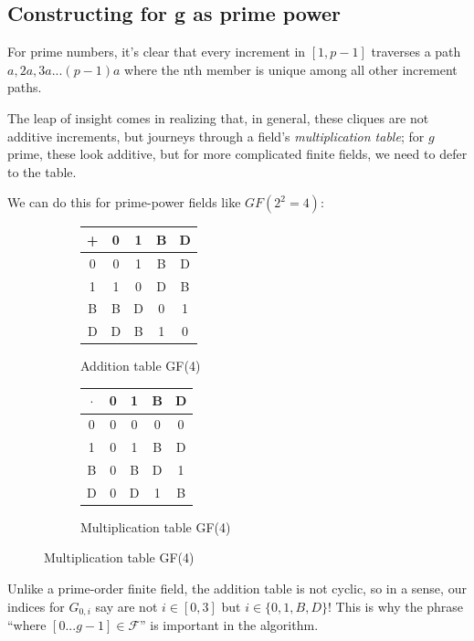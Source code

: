 \documentclass[11pt, oneside]{article} 	%
\begin{document}
\subsection{Constructing for g as prime power}

For prime numbers, it's clear that every increment in $[1, p-1]$ traverses a path $a, 2a, 3a ... (p-1)a$ where the nth member is unique among all other increment paths.

The leap of insight comes in realizing that, in general, these cliques are not additive increments, but journeys through a field's \emph{multiplication table}; for $g$ prime, these look additive, but for more complicated finite fields, we need to defer to the table.

We can do this for prime-power fields like $GF(2^2=4)$: 

\begin{figure}[!htb]
\centering
\begin{subfigure}{.3\textwidth}
 \centering
 \begin{tabular}{c | c c c c}
 + & 0 & 1 & B & D \\
\hline
 0 & 0 & 1 & B & D \\
 1 & 1 & 0 & D & B \\
 B & B & D & 0 & 1 \\
 D & D & B & 1 & 0 \\
 \end{tabular}
 \caption{Addition table GF(4)}
\label{fig:gf4-add}
\end{subfigure}
\begin{subfigure}{.3\textwidth}
 \centering
\begin{tabular}{c | c c c c}
 $\cdot$ & 0 & 1 & B & D \\
\hline
 0 & 0 & 0 & 0 & 0 \\
 1 & 0 & 1 & B & D \\
 B & 0 & B & D & 1 \\
 D & 0 & D & 1 & B \\
\end{tabular}
 \caption{Multiplication table GF(4)}
\label{fig:gf4-mult}
\end{subfigure}
\end{figure}

Unlike a prime-order finite field, the addition table is not cyclic, so in a sense, our indices for $G_{0,i}$ say are not $i \in [0, 3]$ but $i \in \{0,1,B,D\}$! This is why the phrase ``where $[0...g-1] \in \mathcal{F}$'' is important in the algorithm.
\end{document}

